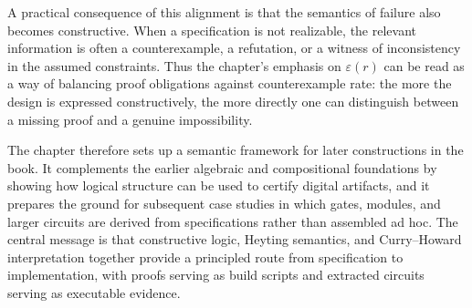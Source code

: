\documentclass[11pt]{article}
\begin{document}
A practical consequence of this alignment is that the semantics of failure also becomes constructive. When a specification is not realizable, the relevant information is often a counterexample, a refutation, or a witness of inconsistency in the assumed constraints. Thus the chapter's emphasis on \(\varepsilon(r)\) can be read as a way of balancing proof obligations against counterexample rate: the more the design is expressed constructively, the more directly one can distinguish between a missing proof and a genuine impossibility.

The chapter therefore sets up a semantic framework for later constructions in the book. It complements the earlier algebraic and compositional foundations by showing how logical structure can be used to certify digital artifacts, and it prepares the ground for subsequent case studies in which gates, modules, and larger circuits are derived from specifications rather than assembled ad hoc. The central message is that constructive logic, Heyting semantics, and Curry--Howard interpretation together provide a principled route from specification to implementation, with proofs serving as build scripts and extracted circuits serving as executable evidence.
\end{document}
